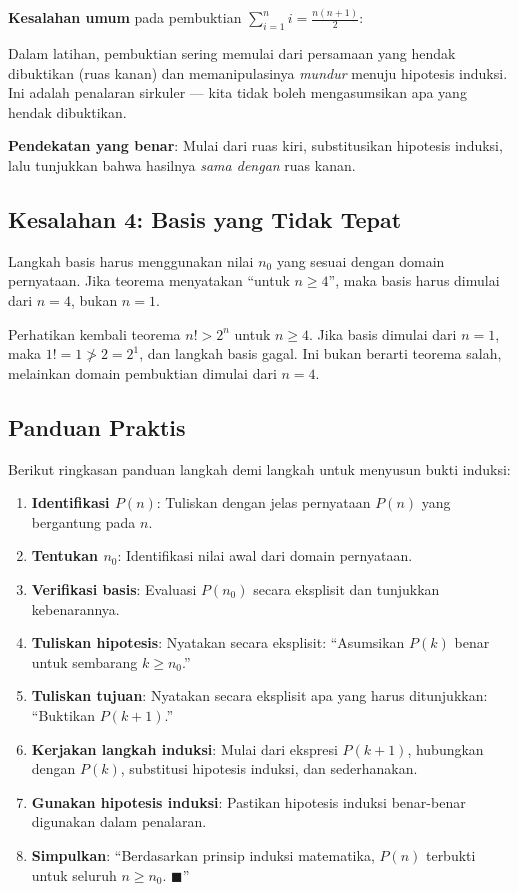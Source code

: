 \begin{contoh}
\textbf{Kesalahan umum} pada pembuktian $\sum_{i=1}^{n} i = \frac{n(n+1)}{2}$:

Dalam latihan, pembuktian sering memulai dari persamaan yang hendak dibuktikan (ruas kanan) dan memanipulasinya \emph{mundur} menuju hipotesis induksi. Ini adalah penalaran sirkuler --- kita tidak boleh mengasumsikan apa yang hendak dibuktikan.

\textbf{Pendekatan yang benar}: Mulai dari ruas kiri, substitusikan hipotesis induksi, lalu tunjukkan bahwa hasilnya \emph{sama dengan} ruas kanan.
\end{contoh}

\subsection{Kesalahan 4: Basis yang Tidak Tepat}

Langkah basis harus menggunakan nilai $n_0$ yang sesuai dengan domain pernyataan. Jika teorema menyatakan ``untuk $n \geq 4$'', maka basis harus dimulai dari $n = 4$, bukan $n = 1$.

\begin{contoh}
Perhatikan kembali teorema $n! > 2^n$ untuk $n \geq 4$. Jika basis dimulai dari $n = 1$, maka $1! = 1 \not> 2 = 2^1$, dan langkah basis gagal. Ini bukan berarti teorema salah, melainkan domain pembuktian dimulai dari $n = 4$.
\end{contoh}

\subsection{Panduan Praktis}

Berikut ringkasan panduan langkah demi langkah untuk menyusun bukti induksi:

\begin{enumerate}
  \item \textbf{Identifikasi $P(n)$}: Tuliskan dengan jelas pernyataan $P(n)$ yang bergantung pada $n$.
  \item \textbf{Tentukan $n_0$}: Identifikasi nilai awal dari domain pernyataan.
  \item \textbf{Verifikasi basis}: Evaluasi $P(n_0)$ secara eksplisit dan tunjukkan kebenarannya.
  \item \textbf{Tuliskan hipotesis}: Nyatakan secara eksplisit: ``Asumsikan $P(k)$ benar untuk sembarang $k \geq n_0$.''
  \item \textbf{Tuliskan tujuan}: Nyatakan secara eksplisit apa yang harus ditunjukkan: ``Buktikan $P(k+1)$.''
  \item \textbf{Kerjakan langkah induksi}: Mulai dari ekspresi $P(k+1)$, hubungkan dengan $P(k)$, substitusi hipotesis induksi, dan sederhanakan.
  \item \textbf{Gunakan hipotesis induksi}: Pastikan hipotesis induksi benar-benar digunakan dalam penalaran.
  \item \textbf{Simpulkan}: ``Berdasarkan prinsip induksi matematika, $P(n)$ terbukti untuk seluruh $n \geq n_0$. $\blacksquare$''
\end{enumerate}

